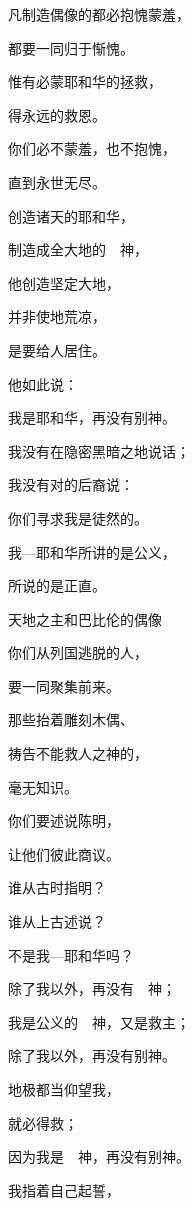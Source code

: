 {\par }{\Q {}凡制造偶像的都必抱愧蒙羞，
\par }{\Q 都要一同归于惭愧。
\par }{\Q {}惟有{}必蒙耶和华的拯救，
\par }{\Q 得永远的救恩。
\par }{\Q 你们必不蒙羞，也不抱愧，
\par }{\Q 直到永世无尽。
\par }{\BB \par }{\Q {}创造诸天的耶和华，
\par }{\Q 制造成全大地的　神，
\par }{\Q 他创造坚定大地，
\par }{\Q 并非使地荒凉，
\par }{\Q 是要给人居住。
\par }{\Q 他如此说：
\par }{\Q 我是耶和华，再没有别神。
\par }{\Q {}我没有在隐密黑暗之地说话；
\par }{\Q 我没有对{}的后裔说：
\par }{\Q 你们寻求我是徒然的。
\par }{\Q 我—耶和华所讲的是公义，
\par }{\Q 所说的是正直。
\par }{\SH 天地之主和巴比伦的偶像
\par }{\Q {}你们从列国逃脱的人，
\par }{\Q 要一同聚集前来。
\par }{\Q 那些抬着雕刻木偶、
\par }{\Q 祷告不能救人之神的，
\par }{\Q 毫无知识。
\par }{\Q {}你们要述说陈明{}，
\par }{\Q 让他们彼此商议。
\par }{\Q 谁从古时指明？
\par }{\Q 谁从上古述说？
\par }{\Q 不是我—耶和华吗？
\par }{\Q 除了我以外，再没有　神；
\par }{\Q 我是公义的　神，又是救主；
\par }{\Q 除了我以外，再没有别神。
\par }{\Q {}地极{}都当仰望我，
\par }{\Q 就必得救；
\par }{\Q 因为我是　神，再没有别神。
\par }{\Q {}我指着自己起誓，
}
